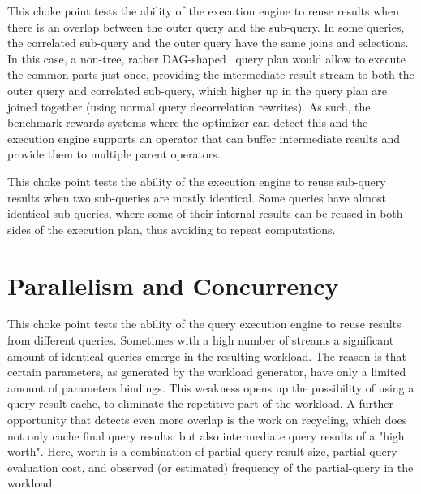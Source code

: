 



This choke point tests the ability of the execution engine to reuse results when there is an overlap between the outer query and the sub-query. In some queries, the correlated sub-query and the outer query have the same joins and selections.
In this case, a non-tree, rather DAG-shaped~\cite{DBLP:conf/btw/NeumannM09} query plan would allow to execute the common parts just once, providing the intermediate result stream to both the outer query and correlated sub-query,
which higher up in the query plan are joined together (using normal query decorrelation rewrites).
As such, the benchmark rewards systems where the optimizer can detect this and the execution engine supports an operator that can buffer intermediate results and provide them to multiple parent operators.





This choke point tests the ability of the execution engine to reuse sub-query results when two sub-queries are mostly identical.
Some queries have almost identical sub-queries, where some of their internal results can be reused in both sides of the execution plan, thus avoiding to repeat computations.




\section{Parallelism and Concurrency}



This choke point tests the ability of the query execution engine to reuse results from different queries. Sometimes with a high number of streams a significant amount of identical queries emerge in the resulting workload.
The reason is that certain parameters, as generated by the workload generator, have only a limited amount of parameters bindings.
This weakness opens up the possibility of using a query result cache, to eliminate the repetitive part of the workload.
A further opportunity that detects even more overlap is the work on recycling, which does not only cache final query results, but also intermediate query results of a "high worth".
Here, worth is a combination of partial-query result size, partial-query evaluation cost, and observed (or estimated) frequency of the partial-query in the workload.

